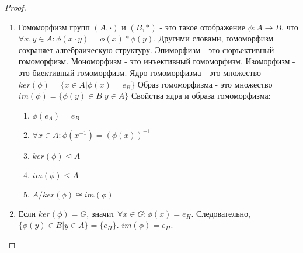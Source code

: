 \begin{proof}
	\begin{minipage}[t]{\linegoal}
		\begin{enumerate}[label=(\alph*), leftmargin=*]
			\item Гомоморфизм групп $(A,\cdot)$ и $(B,*)$ - это такое отображение $\phi:A\rightarrow B$, что $\forall x,y\in A:\phi(x\cdot y)=\phi(x)*\phi(y)$. Другими словами, гомоморфизм сохраняет алгебраическую структуру.
			\newline
			Эпиморфизм - это сюръективный гомоморфизм.
			\newline
			Мономорфизм - это инъективный гомоморфизм.
			\newline
			Изоморфизм - это биективный гомоморфизм.
			\newline
			Ядро гомоморфизма - это множество $ker(\phi)=\{x\in A|\phi(x)=e_B\}$
			\newline
			Образ гомоморфизма - это множество $im(\phi)=\{\phi(y)\in B|y\in A\}$
			\newline
			Свойства ядра и образа гомоморфизма:
			\begin{enumerate}
				\item $\phi(e_A) = e_B$
				\item $\forall x\in A:\phi(x^{-1})=(\phi(x))^{-1}$
				\item $ker(\phi)\trianglelefteq A$
				\item $im(\phi)\leq A$
				\item $A/ker(\phi)\cong im(\phi)$
			\end{enumerate}
			\item Если $ker(\phi)=G$, значит $\forall x\in G:\phi(x)=e_H$. Следовательно, $\{\phi(y)\in B|y\in A\}=\{e_H\}$. $im(\phi)=e_H$.
		\end{enumerate}
	\end{minipage}
\end{proof}